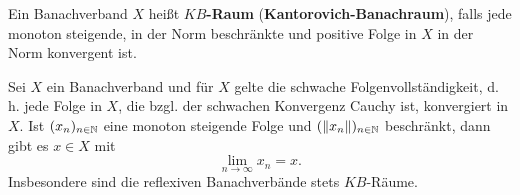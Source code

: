 


\begin{defi}
Ein Banachverband $X$ heißt \textbf{$KB$-Raum} (\textbf{Kantorovich-Banachraum}), falls jede monoton steigende, in der Norm beschränkte und positive Folge in $X$ in der Norm konvergent ist.
\end{defi}



\begin{satz}
Sei $X$ ein Banachverband und für $X$ gelte die schwache Folgenvollständigkeit, d. h. jede Folge in $X$, die bzgl. der schwachen Konvergenz Cauchy ist, konvergiert in  $X$.  Ist $(x_n)_{n\in\mathbb{N}}$ eine monoton steigende Folge und $(\|x_n\|)_{n\in\mathbb{N}}$ beschränkt, dann gibt es $x\in X$ mit
\begin{equation*}
    \lim_{n\to\infty}x_n=x.
\end{equation*}
Insbesondere sind die reflexiven Banachverbände
stets $KB$-Räume.
\end{satz}

